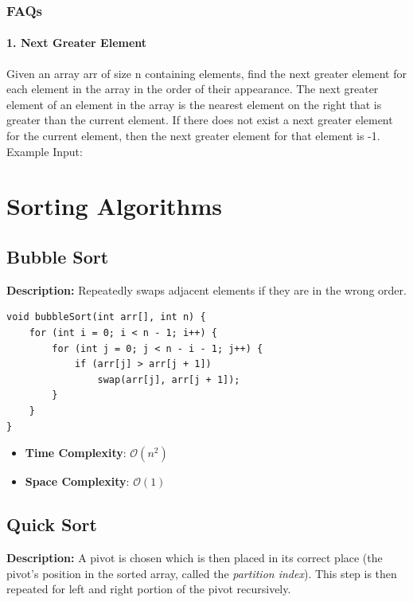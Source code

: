 \documentclass[a4paper, 12pt]{book}
\newcommand{\BigO}[1]{\mathcal{O}\left(#1\right)}
\begin{document}
	\newpage
	
	\subsection{FAQs}
	\subsubsection{1. Next Greater Element}
	Given an array arr of size n containing elements, find the next greater element for each element in the array in the order of their appearance.
	The next greater element of an element in the array is the nearest element on the right that is greater than the current element.
	If there does not exist a next greater element for the current element, then the next greater element for that element is -1.
	\newline \\
	Example
		 Input:	
		
		
	
	\chapter{Sorting Algorithms}
	\section{Bubble Sort}
	
	\textbf{Description:} Repeatedly swaps adjacent elements if they are in the wrong order.
	\begin{tcolorbox}
	\begin{Verbatim}
void bubbleSort(int arr[], int n) {
	for (int i = 0; i < n - 1; i++) {
		for (int j = 0; j < n - i - 1; j++) {
			if (arr[j] > arr[j + 1])
				swap(arr[j], arr[j + 1]);
		}
	}
}
	\end{Verbatim}
\end{tcolorbox}
	
	\begin{itemize}
		\item \textbf{Time Complexity}: $\BigO{n^2}$
		\item \textbf{Space Complexity}: $\BigO{1}$
	\end{itemize}
	
	
	
	\section{Quick Sort}
	\textbf{Description:} A pivot is chosen which is then placed in its correct place (the pivot's position in the sorted array, called the \emph{partition index}). This step is then repeated for left and right portion of the pivot recursively.
	
\end{document}
